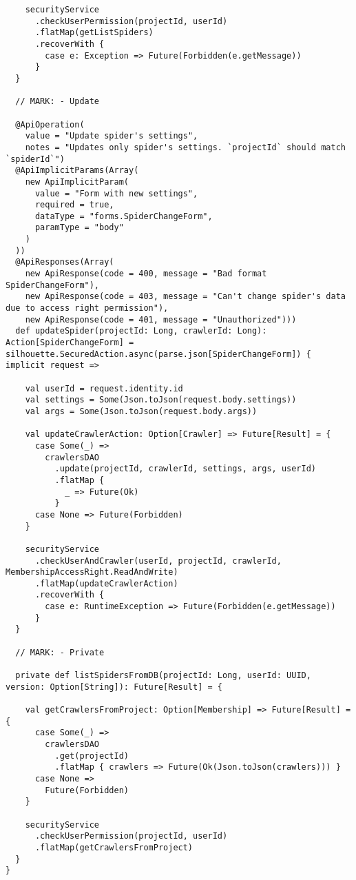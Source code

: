 \begin{lstlisting}
    securityService
      .checkUserPermission(projectId, userId)
      .flatMap(getListSpiders)
      .recoverWith {
        case e: Exception => Future(Forbidden(e.getMessage))
      }
  }

  // MARK: - Update

  @ApiOperation(
    value = "Update spider's settings",
    notes = "Updates only spider's settings. `projectId` should match `spiderId`")
  @ApiImplicitParams(Array(
    new ApiImplicitParam(
      value = "Form with new settings",
      required = true,
      dataType = "forms.SpiderChangeForm",
      paramType = "body"
    )
  ))
  @ApiResponses(Array(
    new ApiResponse(code = 400, message = "Bad format SpiderChangeForm"),
    new ApiResponse(code = 403, message = "Can't change spider's data due to access right permission"),
    new ApiResponse(code = 401, message = "Unauthorized")))
  def updateSpider(projectId: Long, crawlerId: Long): Action[SpiderChangeForm] = silhouette.SecuredAction.async(parse.json[SpiderChangeForm]) { implicit request =>

    val userId = request.identity.id
    val settings = Some(Json.toJson(request.body.settings))
    val args = Some(Json.toJson(request.body.args))

    val updateCrawlerAction: Option[Crawler] => Future[Result] = {
      case Some(_) =>
        crawlersDAO
          .update(projectId, crawlerId, settings, args, userId)
          .flatMap {
            _ => Future(Ok)
          }
      case None => Future(Forbidden)
    }

    securityService
      .checkUserAndCrawler(userId, projectId, crawlerId, MembershipAccessRight.ReadAndWrite)
      .flatMap(updateCrawlerAction)
      .recoverWith {
        case e: RuntimeException => Future(Forbidden(e.getMessage))
      }
  }

  // MARK: - Private

  private def listSpidersFromDB(projectId: Long, userId: UUID, version: Option[String]): Future[Result] = {

    val getCrawlersFromProject: Option[Membership] => Future[Result] = {
      case Some(_) =>
        crawlersDAO
          .get(projectId)
          .flatMap { crawlers => Future(Ok(Json.toJson(crawlers))) }
      case None =>
        Future(Forbidden)
    }

    securityService
      .checkUserPermission(projectId, userId)
      .flatMap(getCrawlersFromProject)
  }
}
\end{lstlisting}
